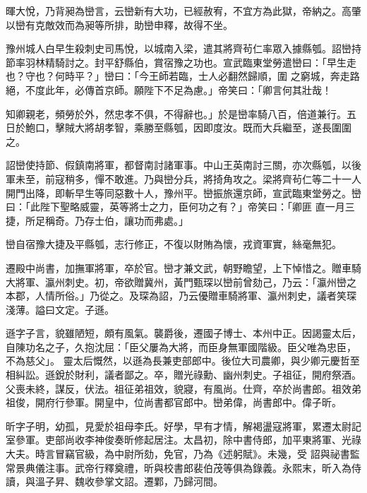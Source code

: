 \begin{pinyinscope}
 暉大悅，乃背昶為巒言，云巒新有大功，已經赦宥，不宜方為此獄，帝納之。高肇以巒有克敵效而為昶等所排，助巒申釋，故得不坐。



 豫州城人白早生殺刺史司馬悅，以城南入梁，遣其將齊茍仁率眾入據縣瓠。詔巒持節率羽林精騎討之。封平舒縣伯，賞宿豫之功也。宣武臨東堂勞遣巒曰：「早生走也？守也？何時平？」巒曰：「今王師若臨，士人必翻然歸順，圍
 之窮城，奔走路絕，不度此年，必傳首京師。願陛下不足為慮。」帝笑曰：「卿言何其壯哉！



 知卿親老，頻勞於外，然忠孝不俱，不得辭也。」於是巒率騎八百，倍道兼行。五日於鮑口，擊賊大將胡孝智，乘勝至縣瓠，因即度汝。既而大兵繼至，遂長圍圍之。



 詔巒使持節、假鎮南將軍，都督南討諸軍事。中山王英南討三關，亦次縣瓠，以後軍未至，前寇稍多，憚不敢進。乃與巒分兵，將掎角攻之。梁將齊茍仁等二十一人開門出降，即斬早生等同惡數十人，豫州平。巒振旅還京師，宣武臨東堂勞之。巒曰：「此陛下聖略威靈，英等將士之力，臣何功之有？」帝笑曰：「卿匪
 直一月三捷，所足稱奇。乃存士伯，讓功而弗處。」



 巒自宿豫大捷及平縣瓠，志行修正，不復以財賄為懷，戎資軍實，絲毫無犯。



 遷殿中尚書，加撫軍將軍，卒於官。巒才兼文武，朝野瞻望，上下悼惜之。贈車騎大將軍、瀛州刺史。初，帝欲贈冀州，黃門甄琛以巒前曾劾己，乃云：「瀛州巒之本郡，人情所俗。」乃從之。及琛為詔，乃云優贈車騎將軍、瀛州刺史，議者笑琛淺薄。謚曰文定。子遜。



 遜字子言，貌雖陋短，頗有風氣。襲爵後，遷國子博士、本州中正。因謁靈太后，自陳功名之子，久抱沈屈：「臣父屢為大將，而臣身無軍國階級。臣父唯為忠臣，不為慈父」。
 靈太后慨然，以遜為長兼吏部郎中。後位大司農卿，與少卿元慶哲至相糾訟。遜銳於財利，議者鄙之。卒，贈光祿勳、幽州刺史。子祖征，開府祭酒。父喪未終，謀反，伏法。祖征弟祖效，貌寢，有風尚。仕齊，卒於尚書郎。祖效弟祖俊，開府行參軍。開皇中，位尚書都官郎中。巒弟偉，尚書郎中。偉子昕。



 昕字子明，幼孤，見愛於祖母李氏。好學，早有才情，解褐盪寇將軍，累遷太尉記室參軍。吏部尚收李神俊奏昕修起居注。太昌初，除中書侍郎，加平東將軍、光祿大夫。時言冒竊官級，為中尉所劾，免官，乃為《述躬賦》。未幾，受
 詔與祕書監常景典儀注事。武帝行釋奠禮，昕與校書郎裴伯茂等俱為錄義。永熙末，昕入為侍讀，與溫子昇、魏收參掌文詔。遷鄴，乃歸河間。




\end{pinyinscope}
